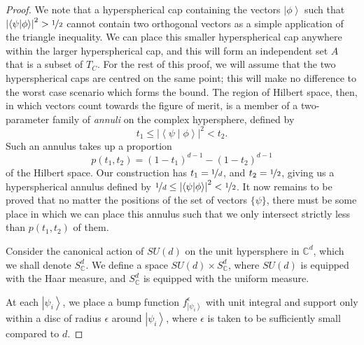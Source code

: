 \documentclass{amsart}
\theoremstyle{definition}
\newcommand{\ket}[1]{{\left\vert{#1}\right\rangle}}
\newcommand{\sprod}[2]{\left|\left< {#1} \middle| {#2} \right>\right|}
\begin{document}
\begin{proof}
We note that a hyperspherical cap containing the vectors $\ket{\phi}$ such that $\sprod{\psi}{\phi}^2> \nicefrac12$ cannot contain two orthogonal vectors as a simple application of the triangle inequality. We can place this smaller hyperspherical cap anywhere within the larger hyperspherical cap, and this will form an independent set $A$ that is a subset of $T_C$. For the rest of this proof, we will assume that the two hyperspherical caps are centred on the same point; this will make no difference to the worst case scenario which forms the bound. The region of Hilbert space, then, in which vectors count towards the figure of merit, is a member of a two-parameter family of \emph{annuli} on the complex hypersphere, defined by
\begin{equation}
t_1\leq\sprod{\psi}{\phi}^2< t_2.
\end{equation}
Such an annulus takes up a proportion 
\begin{equation}p(t_1,t_2)=\left(1-t_1 \right)^{d-1}-\left(1-t_2 \right)^{d-1}\end{equation}
of the Hilbert space. Our construction has $t_1=\nicefrac1d$, and $t_2=\nicefrac12$, giving us a hyperspherical annulus defined by
$\nicefrac1d\leq\sprod{\psi}{\phi}^2< \nicefrac12$.
It now remains to be proved that no matter the positions of the set of vectors $\{\psi\}$, there must be some place in which we can place this annulus such that we only intersect strictly less than $p(t_1,t_2)$ of them. 

Consider the canonical action of $SU(d)$ on the unit hypersphere in $\mathbb{C}^d$, which we shall denote $S_\mathbb{C}^d$. We define a space $SU(d)\times S_\mathbb{C}^d$, where $SU(d)$ is equipped with the Haar measure, and $S_\mathbb{C}^d$ is equipped with the uniform measure.

At each $\ket{\psi_i}$, we place a bump function $f^\epsilon_\ket{\psi_i}$ with unit integral and support only within a disc of radius $\epsilon$ around $\ket{\psi_i}$, where $\epsilon$ is taken to be sufficiently small compared to $d$.


\end{proof}
\end{document}
